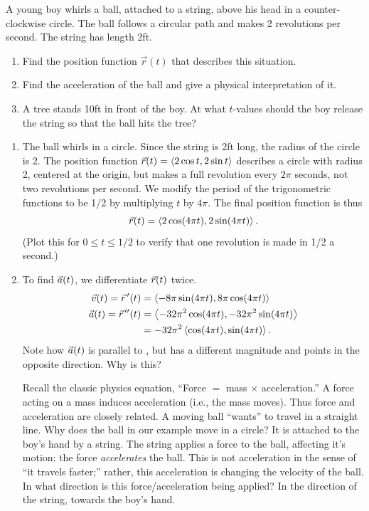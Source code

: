 \begin{example}\label{ex_motion3}%
A young boy whirls a ball, attached to a string, above his head in a counter-clockwise circle. The ball follows a circular path and makes 2 revolutions per second. The string has length 2ft.
\begin{enumerate}
	\item Find the position function $\vec r(t)$ that describes this situation.
	\item	Find the acceleration of the ball and give a physical interpretation of it.
	\item	A tree stands 10ft in front of the boy. At what $t$-values should the boy release the string so that the ball hits the tree?
\end{enumerate}
\solution
\begin{enumerate}
	\item The ball whirls in a  circle. Since the string is 2ft long, the radius of the circle is 2. The position function $\vec r(t) =\left\langle 2\cos t, 2\sin t\right\rangle$ describes a circle with radius 2, centered at the origin, but makes a full revolution every $2\pi$ seconds, not two revolutions per second. We modify the period of the trigonometric functions to be 1/2 by multiplying $t$ by $4\pi$. The final position function is thus \[\vec r(t) =\left\langle 2\cos (4\pi t), 2\sin (4\pi t)\right\rangle.\]
	(Plot this for $0\leq t\leq 1/2$ to verify that one revolution is made in 1/2 a second.)
	
	\item		To find $\vec a(t)$, we differentiate $\vec r(t)$ twice.
	\begin{align*}
	\vec v(t) = \vec r\hskip1.25pt '(t) &=\left\langle -8\pi \sin (4\pi t), 8\pi \cos (4\pi t)\right\rangle\\
	\vec a(t) =\vec r\hskip1.25pt ''(t) &=\left\langle -32\pi^2 \cos (4\pi t), -32\pi^2 \sin (4\pi t)\right\rangle\\
				&= -32\pi^2\left\langle \cos (4\pi t), \sin (4\pi t)\right\rangle.
	\end{align*}
	Note how $\vec a(t)$ is parallel to \vrt, but has a different magnitude and points in the opposite direction. Why is this?
	
	Recall the classic physics equation, ``Force $=$ mass $\times$ acceleration.'' A force acting on a mass induces acceleration (i.e., the mass moves).
	Thus force and acceleration are closely related. A moving ball ``wants'' to travel in a straight line. Why does the ball in our example move in a circle? It is attached to the boy's hand by a string. The string applies a force to the ball, affecting it's motion: the force \emph{accelerates} the ball. This is not acceleration in the sense of ``it travels faster;'' rather, this acceleration is changing the velocity of the ball. In what direction is this force/acceleration being applied? In the direction of the string, towards the boy's hand.
	

\end{enumerate}
\end{example}
